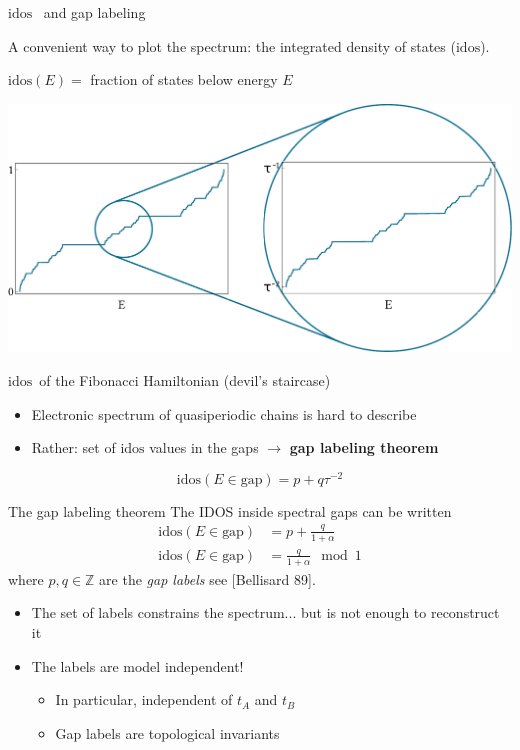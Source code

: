 \documentclass[xcolor=x11names,compress,professionalfonts]{beamer}
\renewcommand{\(}{\begin{columns}}
\renewcommand{\)}{\end{columns}}
\newcommand{\<}[1]{\begin{column}{#1}}
\renewcommand{\>}{\end{column}}
\newcommand{\id}{\ensuremath{\text{idos}}}
\begin{document}
\begin{frame}{\id~ and gap labeling}

A convenient way to plot the spectrum: the integrated density of states ($\id$).

$\id(E) = $ fraction of states below energy $E$

{\centering
\includegraphics[scale=.35]{img/idos_scaling.pdf}

\small{\id~of the Fibonacci Hamiltonian (devil's staircase)}

}

\begin{itemize}
	\item Electronic spectrum of quasiperiodic chains is hard to describe
	\item Rather: set of $\id$ values in the gaps $\to$ \textbf{gap labeling theorem}
\end{itemize}
\[
	\id(E\in \text{gap}) = p+ q \tau^{-2} 
\]

\end{frame}

\begin{frame}{The gap labeling theorem}
The IDOS inside spectral gaps can be written
	\begin{align*}
		\id(E \in \text{gap}) &= p+\frac{q}{1+\alpha} \\
		\id(E \in \text{gap}) &=  \frac{q}{1+\alpha} \mod 1
	\end{align*}
	where $p, q \in \mathbb{Z}$ are the \emph{gap labels} {\scriptsize see [Bellisard 89]}.
\begin{itemize}
	\item The set of labels constrains the spectrum... but is not enough to reconstruct it
	\item The labels are model independent! 
	\begin{itemize}
		\item In particular, independent of $t_A$ and $t_B$
		\item Gap labels are topological invariants
	\end{itemize}
\end{itemize}


\end{frame}
\end{document}
